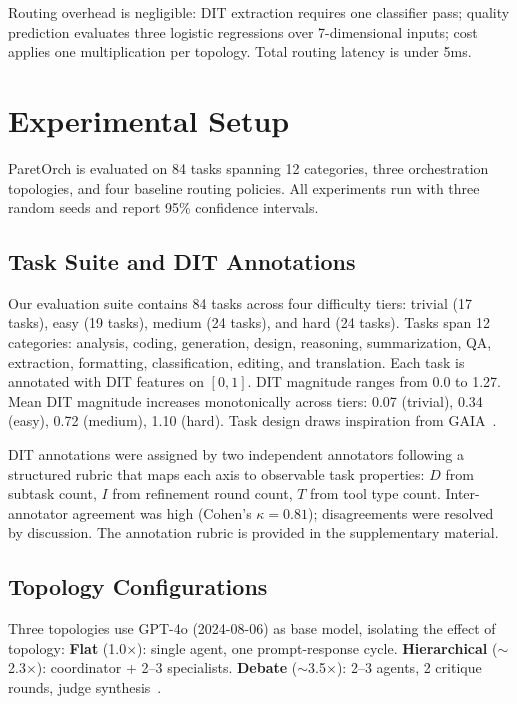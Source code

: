\documentclass{article}
\begin{document}
Routing overhead is negligible: DIT extraction requires one classifier pass; quality prediction evaluates three logistic regressions over 7-dimensional inputs; cost applies one multiplication per topology. Total routing latency is under 5ms.

\section{Experimental Setup}
\label{sec:experiments}

ParetOrch is evaluated on 84 tasks spanning 12 categories, three orchestration topologies, and four baseline routing policies. All experiments run with three random seeds and report 95\% confidence intervals.

\subsection{Task Suite and DIT Annotations}

Our evaluation suite contains 84 tasks across four difficulty tiers: trivial (17 tasks), easy (19 tasks), medium (24 tasks), and hard (24 tasks). Tasks span 12 categories: analysis, coding, generation, design, reasoning, summarization, QA, extraction, formatting, classification, editing, and translation. Each task is annotated with DIT features on $[0,1]$. DIT magnitude ranges from 0.0 to 1.27. Mean DIT magnitude increases monotonically across tiers: 0.07 (trivial), 0.34 (easy), 0.72 (medium), 1.10 (hard). Task design draws inspiration from GAIA~\cite{mialon2023gaia}.

DIT annotations were assigned by two independent annotators following a structured rubric that maps each axis to observable task properties: $D$ from subtask count, $I$ from refinement round count, $T$ from tool type count. Inter-annotator agreement was high (Cohen's $\kappa = 0.81$); disagreements were resolved by discussion. The annotation rubric is provided in the supplementary material.

\subsection{Topology Configurations}

Three topologies use GPT-4o (2024-08-06) as base model, isolating the effect of topology:
\textbf{Flat} (1.0$\times$): single agent, one prompt-response cycle.
\textbf{Hierarchical} (${\sim}$2.3$\times$): coordinator + 2--3 specialists.
\textbf{Debate} (${\sim}$3.5$\times$): 2--3 agents, 2 critique rounds, judge synthesis~\cite{du2023debate}.
\end{document}
